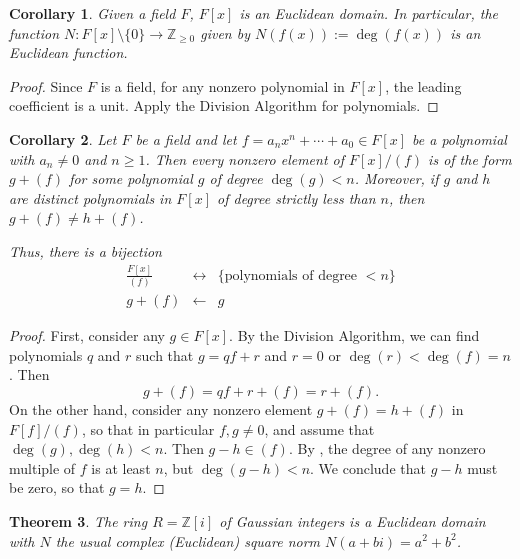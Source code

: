 \documentclass[12pt]{report}
\newtheorem{theorem}{Theorem}[chapter]
\newtheorem{corollary}[theorem]{Corollary}
\numberwithin{equation}{section}
\numberwithin{theorem}{chapter}
\theoremstyle{definition}
\newtheorem*{basic properties}{Basic Properties}
\newtheorem*{Important Remark}{Important Remark}
\begin{document}
\begin{corollary}\label{F[x] is an euclidean domain}
Given a field $F$, $F[x]$ is an Euclidean domain. In particular, the function $N\!: F[x] \setminus \{ 0 \} \longrightarrow \mathbb{Z}_{\geqslant 0}$ given by $N(f(x)) := \deg(f(x))$ is an Euclidean function.
\end{corollary}


\begin{proof}
	Since $F$ is a field, for any nonzero polynomial in $F[x]$, the leading coefficient is a unit. Apply the Division Algorithm for polynomials.
\end{proof}


\begin{corollary}
	Let $F$ be a field and let $f = a_nx^n + \cdots + a_0 \in F[x]$ be a polynomial with $a_n \neq 0$ and $n \geqslant 1$. Then every nonzero element of $F[x]/(f)$ is of the form $g + (f)$ for some polynomial $g$ of degree $\deg(g)<n$. Moreover, if $g$ and $h$ are distinct polynomials in $F[x]$ of degree strictly less than $n$, then $g+(f) \neq h + (f)$.
	
	Thus, there is a bijection
	\[\begin{array}{ccc}  \displaystyle\frac{F[x]}{(f)} &\longleftrightarrow & \{ \text{polynomials of degree $<n$} \} \\
	g + (f) & \longleftarrow & g \end{array}\]
\end{corollary}


\begin{proof}
	First, consider any $g \in F[x]$. By the Division Algorithm, we can find polynomials $q$ and $r$ such that $g=qf+r$ and $r = 0$ or $\deg(r)<\deg(f)=n$. Then
	$$g + (f) = qf+r+(f) = r+(f).$$
	On the other hand, consider any nonzero element $g+(f) = h+(f)$ in $F[f]/(f)$, so that in particular $f, g \neq 0$, and assume that $\deg(g), \deg(h) < n$. Then $g-h \in (f)$. By , the degree of any nonzero multiple of $f$ is at least $n$, but $\deg(g-h) < n$. We conclude that $g-h$ must be zero, so that $g=h$.
\end{proof}





\begin{theorem}\label{Z[i] is an euclidean domain}
The ring $R = \mathbb{Z}[i]$ of Gaussian integers is a Euclidean domain with $N$ the usual complex (Euclidean) square norm $N(a+bi)=a^2+b^2$.
\end{theorem}
\end{document}
